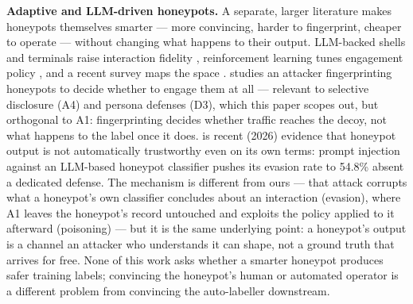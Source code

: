 \textbf{Adaptive and LLM-driven honeypots.} A separate, larger literature makes honeypots
themselves smarter — more convincing, harder to fingerprint, cheaper to operate — without
changing what happens to their output. LLM-backed shells and terminals raise interaction
fidelity \cite{fan2024honeyllm,wang2024honeygpt,otal2024llmhoneypot}, reinforcement learning
tunes engagement policy \cite{huang2019adaptive}, and a recent survey maps the space
\cite{bridges2025sok}. \citet{srinivasa2023gotta} studies an attacker fingerprinting honeypots
to decide whether to engage them at all — relevant to selective disclosure (A4) and persona
defenses (D3), which this paper scopes out, but orthogonal to A1: fingerprinting decides whether
traffic reaches the decoy, not what happens to the label once it does. \citet{yanez2026hiveai}
is recent (2026) evidence that honeypot output is not automatically trustworthy even on its own
terms: prompt injection against an LLM-based honeypot classifier pushes its evasion rate to
54.8\% absent a dedicated defense. The mechanism is different from ours — that attack corrupts
what a honeypot's own classifier concludes about an interaction (evasion), where A1 leaves the
honeypot's record untouched and exploits the policy applied to it afterward (poisoning) — but it
is the same underlying point: a honeypot's output is a channel an attacker who understands it can
shape, not a ground truth that arrives for free. None of this work asks whether a smarter
honeypot produces safer training labels; convincing the honeypot's human or automated operator is
a different problem from convincing the auto-labeller downstream.

